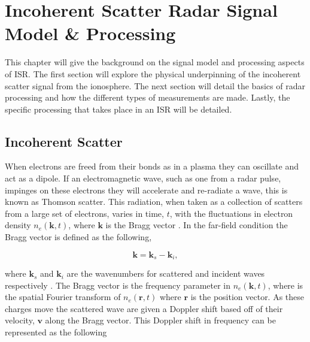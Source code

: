 \chapter{Incoherent Scatter Radar Signal Model \& Processing}
\label{chapter:isrproc}
\thispagestyle{myheadings}

\graphicspath{{2_ISRProc/Figures/}}


This chapter will give the background on the signal model and processing aspects of ISR. The first section will explore the physical  underpinning of the incoherent scatter signal from the ionosphere. The next section will detail the basics of radar processing and how the different types of measurements are made. Lastly, the specific processing that takes place in an ISR will be detailed.

\section{Incoherent Scatter}

When electrons are freed from their bonds as in a plasma they can oscillate and act as a dipole. If an electromagnetic wave, such as one from a radar pulse, impinges on these electrons they will accelerate and re-radiate a wave, this is known as Thomson scatter. This radiation, when taken as a collection of scatters from a large set of electrons, varies in time, $t$, with the fluctuations in electron density $n_e(\mathbf{k},t)$, where $\mathbf{k}$ is the Bragg vector  \cite{kudeki:milla:1}. In the far-field condition the Bragg vector is defined as the following,

\begin{equation}
\label{eqn:bragg}
\mathbf{k}=\mathbf{k}_s-\mathbf{k}_i,
\end{equation}

\noindent where $\mathbf{k}_s$ and $\mathbf{k}_i$ are the wavenumbers for scattered and incident waves respectively \cite{sheffield2010}. The Bragg vector is the frequency parameter in $n_e(\mathbf{k},t)$, where is the spatial Fourier transform of $n_e(\mathbf{r},t)$ where $\mathbf{r}$ is the position vector. As these charges move the scattered wave are given a Doppler shift based off of their velocity, $\mathbf{v}$ along the Bragg vector. This Doppler shift in frequency can be represented as the following 

